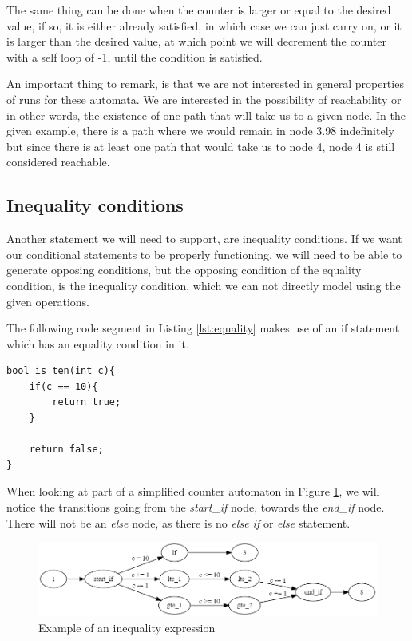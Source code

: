 \documentclass[12pt]{thesis}
\begin{document}
The same thing can be done when the counter is larger or equal to the desired value, if so, it is either already satisfied, in which case we can just carry on, or it is larger than the desired value, at which point we will decrement the counter with a self loop of -1, until the condition is satisfied.

An important thing to remark, is that we are not interested in general properties of runs for these automata. We are interested in the possibility of reachability or in other words, the existence of one path that will take us to a given node. In the given example, there is a path where we would remain in node 3.98 indefinitely but since there is at least one path that would take us to node 4, node 4 is still considered reachable.

\subsection{Inequality conditions}
\label{sec:inequality}
Another statement we will need to support, are inequality conditions. If we want our conditional statements to be properly functioning, we will need to be able to generate opposing conditions, but the opposing condition of the equality condition, is the inequality condition, which we can not directly model using the given operations.

The following code segment in Listing \ref{lst:equality} makes use of an if statement which has an equality condition in it.

\begin{lstlisting}[style=CStyle, caption={Example of C code containing an equality condition}, label={lst:equality}]
bool is_ten(int c){
	if(c == 10){
		return true;
	}

	return false;
}
\end{lstlisting}

When looking at part of a simplified counter automaton in Figure \ref{fig:inequality_expression}, we will notice the transitions going from the \textit{start\_if} node, towards the \textit{end\_if} node. There will not be an \textit{else} node, as there is no \textit{else if} or \textit{else} statement.

\begin{figure}[h]
	\centering
	\includegraphics[width=\linewidth]{inequality_expression}
	\caption{Example of an inequality expression}
	\label{fig:inequality_expression}
\end{figure}
\end{document}

